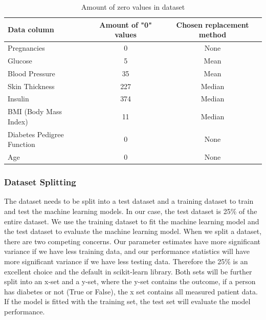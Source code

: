 \documentclass[11pt]{article}
\renewcommand{\arraystretch}{1.3}
\begin{document}
	\begin{table}[H]
		\centering
		\begin{tabular}{lcc}
			Data column & Amount of "0" values & Chosen replacement method \\
			\toprule
			Pregnancies          &         0 &  None \\
 			Glucose              &         5 & Mean \\
			Blood Pressure        &        35 & Mean \\
			Skin Thickness        &       227 & Median\\
			Insulin              &       374  & Median\\
			BMI (Body Mass Index) &        11 & Median \\
			Diabetes Pedigree Function  &    0 & None \\
			Age                  &         0 & None \\
		\end{tabular}
		\caption{Amount of zero values in dataset}
		\label{tab:nullValues}
	\end{table}
	\subsubsection{Dataset Splitting}
	The dataset needs to be split into a test dataset and a training dataset to train and test the machine learning models. In our case, the test dataset is 25\% of the entire dataset. We use the training dataset to fit the machine learning model and the test dataset to evaluate the machine learning model.  When we split a dataset, there are two competing concerns. Our parameter estimates have more significant variance if we have less training data, and our performance statistics will have more significant variance if we have less testing data. Therefore the 25\% is an excellent choice and the default in scikit-learn library. 
	\medbreak
	Both sets will be further split into an x-set and a y-set, where the y-set contains the outcome, if a person has diabetes or not (True or False), the x set contains all measured patient data. If the model is fitted with the training set, the test set will evaluate the model performance.
	
\end{document}
